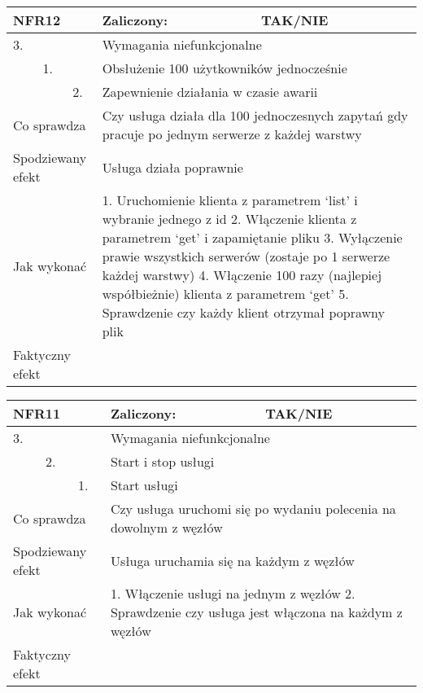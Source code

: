 \begin{tabular}{|p{20pt}|p{20pt}|p{20pt}|p{250pt}|p{60pt}|}
	\hline
	\multicolumn{3}{|p{70pt}|}{NFR12} & Zaliczony: & TAK/NIE \\ \hline
	3. & & & \multicolumn{2}{|p{310pt}|}{Wymagania niefunkcjonalne } \\ \hline
	& 1. & & \multicolumn{2}{|p{310pt}|}{Obsłużenie 100 użytkowników jednocześnie } \\ \hline
	& & 2. & \multicolumn{2}{|p{310pt}|}{Zapewnienie działania w czasie awarii } \\ \hline
	\multicolumn{3}{|p{70pt}|}{Co sprawdza} & \multicolumn{2}{|p{310pt}|}{Czy usługa działa dla 100 jednoczesnych zapytań gdy pracuje po jednym serwerze z każdej warstwy} \\ \hline
	\multicolumn{3}{|p{70pt}|}{Spodziewany efekt} & \multicolumn{2}{|p{310pt}|}{Usługa działa poprawnie} \\ \hline
	\multicolumn{3}{|p{70pt}|}{Jak wykonać} & \multicolumn{2}{|p{310pt}|}{1. Uruchomienie klienta z parametrem ‘list’ i wybranie jednego z id
2. Włączenie klienta z parametrem ‘get’ i zapamiętanie pliku
3. Wyłączenie prawie wszystkich serwerów (zostaje po 1 serwerze każdej warstwy)
4. Włączenie 100 razy (najlepiej współbieżnie) klienta z parametrem ‘get’
5. Sprawdzenie czy każdy klient otrzymał poprawny plik} \\ \hline
	\multicolumn{3}{|p{70pt}|}{Faktyczny efekt} & \multicolumn{2}{|p{310pt}|}{} \\ \hline
\end{tabular}

\begin{tabular}{|p{20pt}|p{20pt}|p{20pt}|p{250pt}|p{60pt}|}
	\hline
	\multicolumn{3}{|p{70pt}|}{NFR11} & Zaliczony: & TAK/NIE \\ \hline
	3. & & & \multicolumn{2}{|p{310pt}|}{Wymagania niefunkcjonalne } \\ \hline
	& 2. & & \multicolumn{2}{|p{310pt}|}{Start i stop usługi } \\ \hline
	& & 1. & \multicolumn{2}{|p{310pt}|}{Start usługi } \\ \hline
	\multicolumn{3}{|p{70pt}|}{Co sprawdza} & \multicolumn{2}{|p{310pt}|}{Czy usługa uruchomi się po wydaniu polecenia na dowolnym z węzłów} \\ \hline
	\multicolumn{3}{|p{70pt}|}{Spodziewany efekt} & \multicolumn{2}{|p{310pt}|}{Usługa uruchamia się na każdym z węzłów} \\ \hline
	\multicolumn{3}{|p{70pt}|}{Jak wykonać} & \multicolumn{2}{|p{310pt}|}{1. Włączenie usługi na jednym z węzłów
2. Sprawdzenie czy usługa jest włączona na każdym z węzłów} \\ \hline
	\multicolumn{3}{|p{70pt}|}{Faktyczny efekt} & \multicolumn{2}{|p{310pt}|}{} \\ \hline
\end{tabular}

